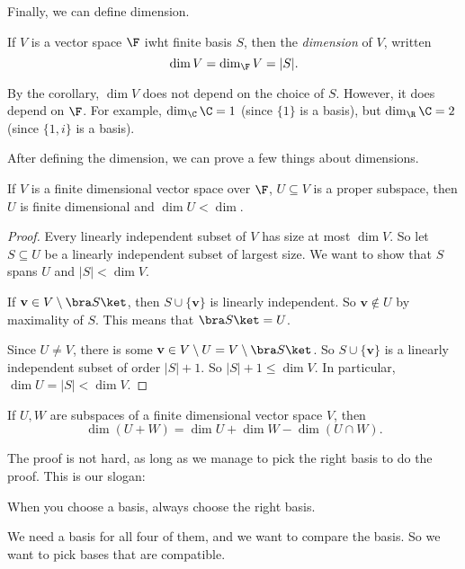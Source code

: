 \documentclass[a4paper]{article}
\begin{document}
Finally, we can define dimension.
\begin{defi}[Dimension]
  If $V$ is a vector space $\F$ iwht finite basis $S$, then the \emph{dimension} of $V$, written
  \[
    \dim V = \dim_{\F}V = |S|.
  \]
\end{defi}
By the corollary, $\dim V$ does not depend on the choice of $S$. However, it does depend on $\F$. For example, $\dim_\C \C = 1$ (since $\{1\}$ is a basis), but $\dim_\R \C = 2$ (since $\{1, i\}$ is a basis).

After defining the dimension, we can prove a few things about dimensions.
\begin{lemma}
  If $V$ is a finite dimensional vector space over $\F$, $U\subseteq V$ is a proper subspace, then $U$ is finite dimensional and $\dim U < \dim $.
\end{lemma}

\begin{proof}
  Every linearly independent subset of $V$ has size at most $\dim V$. So let $S \subseteq U$ be a linearly independent subset of largest size. We want to show that $S$ spans $U$ and $|S| < \dim V$.

  If $\mathbf{v}\in V\setminus \bra S\ket$, then $S\cup \{\mathbf{v}\}$ is linearly independent. So $\mathbf{v}\not\in U$ by maximality of $S$. This means that $\bra S\ket = U$.

  Since $U\not= V$, there is some $\mathbf{v}\in V\setminus U = V\setminus \bra S\ket$. So $S\cup \{\mathbf{v}\}$ is a linearly independent subset of order $|S| + 1$. So $|S| + 1 \leq \dim V$. In particular, $\dim U = |S| < \dim V$.
\end{proof}

\begin{prop}
  If $U, W$ are subspaces of a finite dimensional vector space $V$, then
  \[
    \dim (U + W) = \dim U + \dim W - \dim (U\cap W).
  \]
\end{prop}
The proof is not hard, as long as we manage to pick the right basis to do the proof. This is our slogan:
\begin{center}
  When you choose a basis, always choose the right basis.
\end{center}
We need a basis for all four of them, and we want to compare the basis. So we want to pick bases that are compatible.
\end{document}

